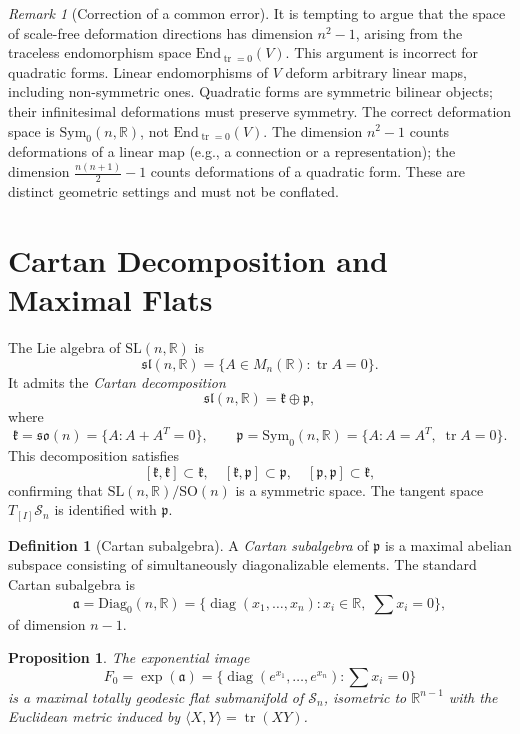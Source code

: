 \documentclass[12pt]{article}
\newtheorem{proposition}[theorem]{Proposition}
\theoremstyle{definition}
\newtheorem{definition}[theorem]{Definition}
\theoremstyle{remark}
\newtheorem{remark}[theorem]{Remark}
\newcommand{\R}{\mathbb{R}}
\newcommand{\SL}{\mathrm{SL}}
\newcommand{\SO}{\mathrm{SO}}
\newcommand{\Symz}{\mathrm{Sym}_{0}}
\newcommand{\Diagz}{\mathrm{Diag}_{0}}
\newcommand{\calM}{\mathcal{S}}
\newcommand{\tr}{\operatorname{tr}}
\newcommand{\diag}{\operatorname{diag}}
\begin{document}
\begin{remark}[Correction of a common error]
\label{rem:correction}
It is tempting to argue that the space of scale-free deformation
directions has dimension $n^2-1$, arising from the traceless
endomorphism space $\mathrm{End}_{\tr=0}(V)$.
This argument is incorrect for quadratic forms.
Linear endomorphisms of $V$ deform arbitrary linear maps, including
non-symmetric ones.
Quadratic forms are symmetric bilinear objects; their infinitesimal
deformations must preserve symmetry.
The correct deformation space is $\Symz(n,\R)$, not
$\mathrm{End}_{\tr=0}(V)$.
The dimension $n^2-1$ counts deformations of a linear map
(e.g., a connection or a representation); the dimension
$\frac{n(n+1)}{2}-1$ counts deformations of a quadratic form.
These are distinct geometric settings and must not be conflated.
\end{remark}

\section{Cartan Decomposition and Maximal Flats}
\label{sec:cartan}

The Lie algebra of $\SL(n,\R)$ is
\[
  \mathfrak{sl}(n,\R) = \{A \in M_n(\R) : \tr A = 0\}.
\]
It admits the \emph{Cartan decomposition}
\[
  \mathfrak{sl}(n,\R) = \mathfrak{k} \oplus \mathfrak{p},
\]
where
\[
  \mathfrak{k} = \mathfrak{so}(n)
    = \{A : A + A^T = 0\},
  \qquad
  \mathfrak{p} = \Symz(n,\R)
    = \{A : A = A^T,\; \tr A = 0\}.
\]
This decomposition satisfies
\[
  [\mathfrak{k},\mathfrak{k}] \subset \mathfrak{k},\quad
  [\mathfrak{k},\mathfrak{p}] \subset \mathfrak{p},\quad
  [\mathfrak{p},\mathfrak{p}] \subset \mathfrak{k},
\]
confirming that $\SL(n,\R)/\SO(n)$ is a symmetric space.
The tangent space $T_{[I]}\calM_n$ is identified with $\mathfrak{p}$.

\begin{definition}[Cartan subalgebra]
A \emph{Cartan subalgebra} of $\mathfrak{p}$ is a maximal abelian
subspace consisting of simultaneously diagonalizable elements.
The standard Cartan subalgebra is
\[
  \mathfrak{a} = \Diagz(n,\R)
  = \{\diag(x_1,\ldots,x_n) : x_i \in \R,\; \textstyle\sum x_i = 0\},
\]
of dimension $n-1$.
\end{definition}

\begin{proposition}
\label{prop:flat}
The exponential image
\[
  F_0 = \exp(\mathfrak{a})
  = \{\diag(e^{x_1},\ldots,e^{x_n}) : \textstyle\sum x_i = 0\}
\]
is a maximal totally geodesic flat submanifold of $\calM_n$,
isometric to $\R^{n-1}$ with the Euclidean metric induced by
$\langle X, Y\rangle = \tr(XY)$.
\end{proposition}
\end{document}
